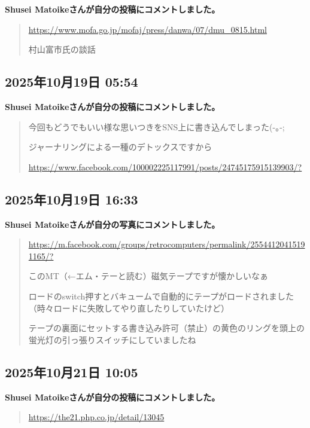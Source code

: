 \textbf{Shusei Matoikeさんが自分の投稿にコメントしました。}

\begin{quote}
\url{https://www.mofa.go.jp/mofaj/press/danwa/07/dmu_0815.html}

村山富市氏の談話
\end{quote}

\subsection*{2025年10月19日 05:54}

\textbf{Shusei Matoikeさんが自分の投稿にコメントしました。}

\begin{quote}
今回もどうでもいい様な思いつきをSNS上に書き込んでしまった(-｡-;

ジャーナリングによる一種のデトックスですから

\url{https://www.facebook.com/100002225117991/posts/24745175915139903/?}
\end{quote}

\subsection*{2025年10月19日 16:33}

\textbf{Shusei Matoikeさんが自分の写真にコメントしました。}

\begin{quote}
\url{https://m.facebook.com/groups/retrocomputers/permalink/25544120415191165/?}

このMT（←エム・テーと読む）磁気テープですが懐かしいなぁ

ロードのswitch押すとバキュームで自動的にテープがロードされました（時々ロードに失敗してやり直したりしていたけど）

テープの裏面にセットする書き込み許可（禁止）の黄色のリングを頭上の蛍光灯の引っ張りスイッチにしていましたね
\end{quote}

\subsection*{2025年10月21日 10:05}

\textbf{Shusei Matoikeさんが自分の投稿にコメントしました。}

\begin{quote}
\url{https://the21.php.co.jp/detail/13045}
\end{quote}

